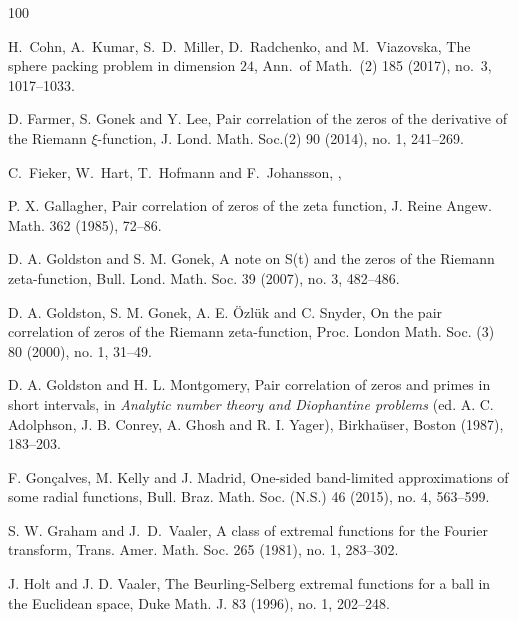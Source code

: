 \documentclass[reqno]{amsart}
\begin{document}
\begin{thebibliography}{100}
	
	H.~Cohn, A.~Kumar, S.~D.~Miller, D.~Radchenko, and M.~Viazovska, 
	\newblock The sphere packing problem in dimension $24$,
	\newblock Ann.\ of Math.\ (2) {185} (2017), no.\ 3, 1017--1033. 
	
	D. Farmer, S. Gonek and Y. Lee, 
	\newblock Pair correlation of the zeros of the derivative of the Riemann $\xi$-function, 
	\newblock J. Lond. Math. Soc.(2) 90 (2014), no. 1, 241--269.
	
	
	C.~Fieker, W.~Hart, T.~Hofmann and F.~Johansson,
	,
	
	
	P. X. Gallagher,
	\newblock Pair correlation of zeros of the zeta function,
	\newblock J. Reine Angew. Math. 362 (1985), 72--86.
	
	
	
	D. A. Goldston and S. M. Gonek,
	\newblock A note on S(t) and the zeros of the Riemann zeta-function,
	\newblock Bull. Lond. Math. Soc. 39 (2007), no. 3, 482--486.
	
	
	
	
	D. A. Goldston, S. M. Gonek, A. E. \"{O}zl\"{u}k and C. Snyder, 
	\newblock On the pair correlation of zeros of the Riemann zeta-function, 
	\newblock Proc. London Math. Soc. (3) 80 (2000), no. 1, 31--49.
	
	
	D. A. Goldston and H. L. Montgomery, 
	\newblock Pair correlation of zeros and primes in short intervals, 
	\newblock in {\it Analytic number theory and Diophantine problems} (ed. A. C. Adolphson, J. B. Conrey, A. Ghosh and R. I. Yager), Birkha\"user, Boston (1987), 183--203.
	
	
	
	F. Gon\c{c}alves, M. Kelly and J. Madrid,
	\newblock One-sided band-limited approximations of some radial functions,
	\newblock Bull. Braz. Math. Soc. (N.S.) 46 (2015), no. 4, 563--599.
	
	
	
	S. W. Graham and J.~D.~Vaaler,
	\newblock A class of extremal functions for the Fourier transform,
	\newblock Trans. Amer. Math. Soc. 265 (1981), no. 1, 283--302.
	
	
	J. Holt and J. D. Vaaler, 
	\newblock The Beurling-Selberg extremal functions for a ball in the Euclidean space, 
	\newblock Duke Math. J. 83 (1996), no. 1, 202--248.
	

\end{thebibliography}
\end{document}
